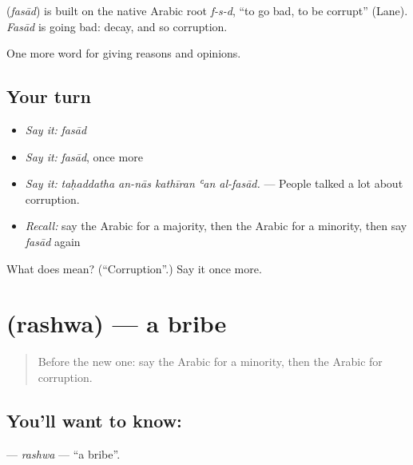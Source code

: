 \begin{cousinweb}
\textbf{} (\emph{fasād}) is built on the native Arabic root \emph{f-s-d}, \textquotedblleft{}to go bad, to be corrupt\textquotedblright{} (Lane). \emph{Fasād} is going bad: decay, and so corruption.
\end{cousinweb}

\begin{grammarlens}[title={What you've built}]
One more word for giving reasons and opinions.
\end{grammarlens}

\subsection*{Your turn}
\begin{itemize}
\raggedright
  \item \emph{Say it:} \emph{fasād}
  \item \emph{Say it:} \emph{fasād}, once more
  \item \emph{Say it:} \emph{taḥaddatha an-nās kathīran ʿan al-fasād.} — People talked a lot about corruption.
  \item \emph{Recall:} say the Arabic for a majority, then the Arabic for a minority, then say \emph{fasād} again
\end{itemize}

\begin{tcolorbox}[breakable,colback=teal!4,colframe=teal!35!black,title={Before you move on}]
What does  mean? (\textquotedblleft{}Corruption\textquotedblright{}.) Say it once more.
\end{tcolorbox}
\section[\texorpdfstring{\ar{رشوة} (rashwa)}{رشوة (rashwa)}]{ (rashwa) — a bribe}

\label{lesson:AR-C388-rashwa}



\begin{quote}
Before the new one: say the Arabic for a minority, then the Arabic for corruption.
\end{quote}

\subsection*{You'll want to know: }
\textbf{} — \emph{rashwa} — \textquotedblleft{}a bribe\textquotedblright{}.

